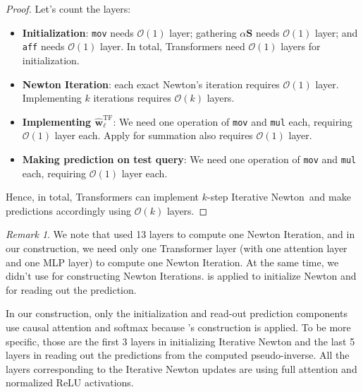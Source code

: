 \documentclass[11pt]{article}
\theoremstyle{plain}
\theoremstyle{definition}
\theoremstyle{remark}
\newtheorem{remark}[theorem]{Remark}
\renewcommand{\^}[1]{^{(#1)}}
\newcommand{\bS}{\boldsymbol{S}}
\newcommand{\bw}{\boldsymbol{w}}
\newcommand{\newton}{Iterative Newton}
\begin{document}
\begin{proof}
Let's count the layers:
\begin{itemize}
    \item \textbf{Initialization}: \verb|mov| needs $\mathcal O(1)$ layer; gathering $\alpha \bS$ needs $\mathcal O(1)$ layer; and \verb|aff| needs $\mathcal O(1)$ layer. In total, Transformers need $\mathcal O(1)$ layers for initialization. 
    \item \textbf{Newton Iteration}: each exact Newton's iteration requires $\mathcal O(1)$ layer. Implementing $k$ iterations requires $\mathcal O(k)$ layers.
    \item \textbf{Implementing $\hat{\bw}_\ell^\mathrm{TF}$}: We need one operation of \verb|mov| and \verb|mul| each, requiring $\mathcal O(1)$ layer each. Apply  for summation also requires $\mathcal O(1)$ layer. 
    \item \textbf{Making prediction on test query}:  We need one operation of \verb|mov| and \verb|mul| each, requiring $\mathcal O(1)$ layer each.
\end{itemize}
Hence, in total, Transformers can implement $k$-step \newton\ and make predictions accordingly using $\mathcal{O}(k)$ layers. 
\end{proof}

{
\begin{remark}
We note that \cite{pmlr-v202-giannou23a} used 13 layers to compute one Newton Iteration, and in our construction, we need only one Transformer layer (with one attention layer and one MLP layer) to compute one Newton Iteration. At the same time, we didn’t use \cite{Akyrek2022WhatLA} for constructing Newton Iterations. \cite{Akyrek2022WhatLA} is applied to initialize Newton and for reading out the prediction. 

In our construction, only the initialization and read-out prediction components use causal attention and softmax because \cite{Akyrek2022WhatLA}'s construction is applied. To be more specific, those are the first 3 layers in initializing Iterative Newton and the last 5 layers in reading out the predictions from the computed pseudo-inverse. All the layers corresponding to the Iterative Newton updates are using full attention and normalized ReLU activations.
\end{remark}

}
\end{document}
